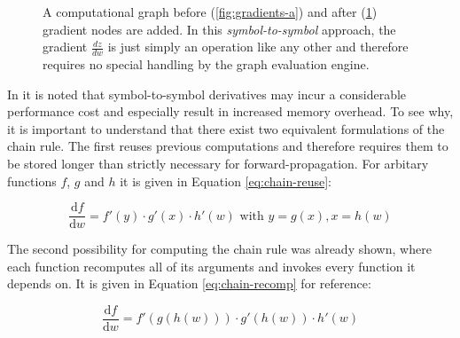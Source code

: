 \begin{figure}
\begin{subfigure}[b]{0.2\textwidth}
    \caption{}
    \label{fig:gradients-b}
  \end{subfigure}
  \caption{A computational graph before (\ref{fig:gradients-a}) and after
    (\ref{fig:gradients-b}) gradient nodes are added. In this
    \emph{symbol-to-symbol} approach, the gradient $\frac{dz}{dw}$ is just
    simply an operation like any other and therefore requires no special
    handling by the graph evaluation engine.}
  \label{fig:gradients}
\end{figure}

In \cite{tensorflow} it is noted that symbol-to-symbol derivatives may incur a
considerable performance cost and especially result in increased memory
overhead. To see why, it is important to understand that there exist two
equivalent formulations of the chain rule. The first reuses previous
computations and therefore requires them to be stored longer than strictly
necessary for forward-propagation. For arbitary functions $f$, $g$ and $h$ it is
given in Equation \ref{eq:chain-reuse}:

\begin{equation}\label{eq:chain-reuse}
  \frac{\mathrm{d} f}{\mathrm{d} w} = f'(y) \cdot g'(x) \cdot h'(w) \text{ with } y = g(x), x =
  h(w)
\end{equation}

The second possibility for computing the chain rule was already shown, where
each function recomputes all of its arguments and invokes every function it
depends on. It is given in Equation \ref{eq:chain-recomp} for reference:

\begin{equation}\label{eq:chain-recomp}
  \frac{\mathrm{d} f}{\mathrm{d} w} = f'(g(h(w))) \cdot g'(h(w)) \cdot h'(w)
\end{equation}

